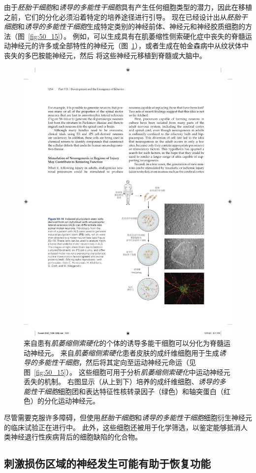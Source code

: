 由于\textit{胚胎干细胞}和\textit{诱导的多能性干细胞}具有产生任何细胞类型的潜力，因此在移植之前，它们的分化必须沿着特定的培养途径进行引导。
现在已经设计出从\textit{胚胎干细胞}和\textit{诱导的多能性干细胞}生成特定类别的神经前体、神经元和神经胶质细胞的方法（图~\ref{fig:50_15}）。
例如，可以生成具有在肌萎缩性侧索硬化症中丧失的脊髓运动神经元的许多或全部特性的神经元（图~\ref{fig:50_16}），或者生成在帕金森病中从纹状体中丧失的多巴胺能神经元，然后 将这些神经元移植到脊髓或大脑中。


\begin{figure}[htbp]
	\centering
	\includegraphics[width=0.7\linewidth]{chap50/fig_50_16}
	\caption{来自患有\textit{肌萎缩侧索硬化}的个体的诱导多能干细胞可以分化为脊髓运动神经元。
		来自\textit{肌萎缩侧索硬化}患者皮肤的成纤维细胞用于生成\textit{诱导的多能性干细胞}，然后将其定向至运动神经元命运（见图~\ref{fig:50_15}）。
		这些细胞可用于分析\textit{肌萎缩侧索硬化}中运动神经元丢失的机制。
		右图显示（从上到下）培养的成纤维细胞、\textit{诱导的多能性干细胞}细胞团和表达特征性核转录因子（绿色）和轴突蛋白（红色）的分化运动神经元。}
	\label{fig:50_16}
\end{figure}


尽管需要克服许多障碍，但使用\textit{胚胎干细胞}和\textit{诱导的多能性干细胞}细胞衍生神经元的临床试验正在进行中。
此外，这些细胞还被用于化学筛选，以鉴定能够抵消人类神经退行性疾病背后的细胞缺陷的化合物。



\subsection{刺激损伤区域的神经发生可能有助于恢复功能}

